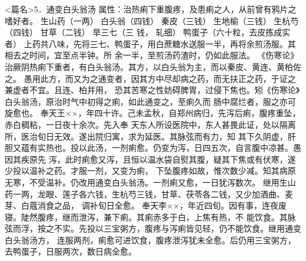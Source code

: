 \documentclass[a4paper,12pt,UTF8,twoside]{ctexbook}
\begin{document}
<篇名>5．通变白头翁汤
属性：治热痢下重腹疼，及患痢之人，从前曾有鸦片之嗜好者。 
生山药（一两） 白头翁（四钱） 秦皮（三钱） 生地榆（三钱） 生杭芍（四钱） 甘草（二钱） 旱三七（三 
钱， 
轧细） 鸭蛋子（六十粒，去皮拣成实者） 
上药共八味，先将三七、鸭蛋子，用白蔗糖水送服一半，再将余煎汤服。其相去之时间，宜至点半钟。所 
余一半，至煎汤药渣时，仍如此服法。 
《伤寒论》治厥阴热痢下重者，有白头翁汤。其方，以白头翁为主，而以秦皮、黄连、黄柏佐之。 
愚用此方，而又为之通变者，因其方中尽却病之药，而无扶正之药，于证之兼虚者不宜。且连、柏并用， 
恐其苦寒之性妨碍脾胃，过侵下焦也。矧《伤寒论》白头翁汤，原治时气中初得之痢，如此通变之，至痢久而 
肠中腐烂者，服之亦可旋愈也。 
奉天王××，年四十许。己未孟秋，自郑州病归，先泻后痢，腹疼重坠，赤白稠粘，一日夜十余次。先入奉 
天东人所设医院中，东人甚畏此证，处以隔离所，医治旬日无效。遂出院归寓，求为延医。其脉弦而有力，知 
其下久阴虚，肝胆又蕴有实热也。投以此汤，一剂痢愈。仍变为泻，日四五次，自言腹中凉甚。愚因其疾原先 
泻，此时痢愈又泻，且恒以温水袋自熨其腹，疑其下焦或有伏寒，遂少投以温补之药。才服一剂，又变为痢， 
下坠腹疼如故，惟次数少减。知其病原无寒，不受温补。仍改用通变白头翁汤。一剂痢又愈，一日犹泻数次。 
继用生山药一两，龙眼、莲子各六钱，生杭芍三钱，甘草、茯苓各二钱，又少加酒曲、麦芽、白蔻消食之品， 
调补旬日全愈。 
奉天李××，年近四旬。因有事，连夜废寝。陡然腹疼，继而泄泻，兼下痢。其痢赤多于白，上焦有热，不 
能饮食。其脉弦而浮，按之不实。先投以三宝粥方，腹疼与泻痢皆见轻，仍不能饮食。继用通变白头翁汤方， 
连服两剂，痢愈可进饮食，腹疼泄泻犹未全愈。后仍用三宝粥方，去鸭蛋子，日服两次，数日病全愈。 
\end{document}
